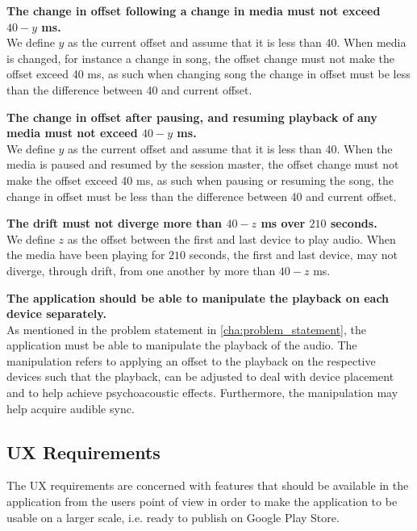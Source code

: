 \begin{eletterate}
\begin{eletterate}
        \item\label{req:change_off} \textbf{The change in offset following a change in media must not exceed $40 - y$ ms.} \hfill\\
            We define $y$ as the current offset and assume that it is less than 40.
            When media is changed, for instance a change in song, the offset change must not make the offset exceed 40 ms, as such when changing song the change in offset must be less than the difference between 40 and current offset.

        \item\label{req:pauseplay} \textbf{The change in offset after pausing, and resuming playback of any media must not exceed $40 - y$ ms.} \hfill\\
            We define $y$ as the current offset and assume that it is less than 40.
            When the media is paused and resumed by the session master, the offset change must not make the offset exceed 40 ms, as such when pausing or resuming the song, the change in offset must be less than the difference between 40 and current offset.

        \item\label{req:drift} \textbf{The drift must not diverge more than $40 - z$ ms over $210$ seconds.} \hfill\\
            We define $z$ as the offset between the first and last device to play audio.
            When the media have been playing for $210$ seconds, the first and last device, may not diverge, through drift, from one another by more than $40 - z$ ms.
    \end{eletterate}

    \item\label{req:manipulate} \textbf{The application should be able to manipulate the playback on each device separately.} \hfill\\
        As mentioned in the problem statement in \cref{cha:problem_statement}, the application must be able to manipulate the playback of the audio.
        The manipulation refers to applying an offset to the playback on the respective devices such that the playback, can be adjusted to deal with device placement and to help achieve psychoacoustic effects.
        Furthermore, the manipulation may help acquire audible sync.
\end{eletterate}

\subsection*{\ac{UX} Requirements}
The \ac{UX} requirements are concerned with features that should be available in the application from the users point of view in order to make the application to be usable on a larger scale, i.e. ready to publish on Google Play Store.

